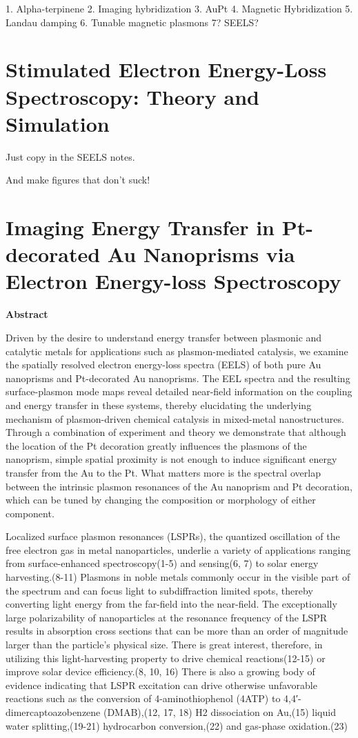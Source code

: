 \documentclass [11pt, proquest] {uwthesis}[2016/11/22]
\begin{document}
1. Alpha-terpinene
2. Imaging hybridization
3. AuPt
4. Magnetic Hybridization 
5. Landau damping
6. Tunable magnetic plasmons
7? SEELS?

 
\chapter{Stimulated Electron Energy-Loss Spectroscopy: Theory and Simulation}

Just copy in the SEELS notes.
 
And make figures that don't suck!
 
 
\chapter{Imaging Energy Transfer in Pt-decorated Au Nanoprisms via Electron Energy-loss Spectroscopy}
 
{\bf Abstract}

Driven by the desire to understand energy transfer between plasmonic and catalytic metals for applications such as plasmon-mediated catalysis, we examine the spatially resolved electron energy-loss spectra (EELS) of both pure Au nanoprisms and Pt-decorated Au nanoprisms. The EEL spectra and the resulting surface-plasmon mode maps reveal detailed near-field information on the coupling and energy transfer in these systems, thereby elucidating the underlying mechanism of plasmon-driven chemical catalysis in mixed-metal nanostructures. Through a combination of experiment and theory we demonstrate that although the location of the Pt decoration greatly influences the plasmons of the nanoprism, simple spatial proximity is not enough to induce significant energy transfer from the Au to the Pt. What matters more is the spectral overlap between the intrinsic plasmon resonances of the Au nanoprism and Pt decoration, which can be tuned by changing the composition or morphology of either component.

Localized surface plasmon resonances (LSPRs), the quantized oscillation of the free electron gas in metal nanoparticles, underlie a variety of applications ranging from surface-enhanced spectroscopy(1-5) and sensing(6, 7) to solar energy harvesting.(8-11) Plasmons in noble metals commonly occur in the visible part of the spectrum and can focus light to subdiffraction limited spots, thereby converting light energy from the far-field into the near-field. The exceptionally large polarizability of nanoparticles at the resonance frequency of the LSPR results in absorption cross sections that can be more than an order of magnitude larger than the particle’s physical size. There is great interest, therefore, in utilizing this light-harvesting property to drive chemical reactions(12-15) or improve solar device efficiency.(8, 10, 16) There is also a growing body of evidence indicating that LSPR excitation can drive otherwise unfavorable reactions such as the conversion of 4-aminothiophenol (4ATP) to 4,4′-dimercaptoazobenzene (DMAB),(12, 17, 18) H2 dissociation on Au,(15) liquid water splitting,(19-21) hydrocarbon conversion,(22) and gas-phase oxidation.(23)
\end{document}
